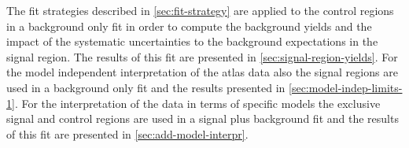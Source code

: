 The fit strategies described in \cref{sec:fit-strategy} are applied to the
control regions in a background only fit in order to compute the background
yields and the impact of the systematic uncertainties to the background
expectations in the signal region. The results of this fit are presented in
\cref{sec:signal-region-yields}. For the model independent interpretation of the
\gls{atlas} data also the signal regions are used in a background only fit and
the results presented in \cref{sec:model-indep-limits-1}. For the interpretation
of the data in terms of specific models the exclusive signal and control regions
are used in a signal plus background fit and the results of this fit are
presented in \cref{sec:add-model-interpr}.
